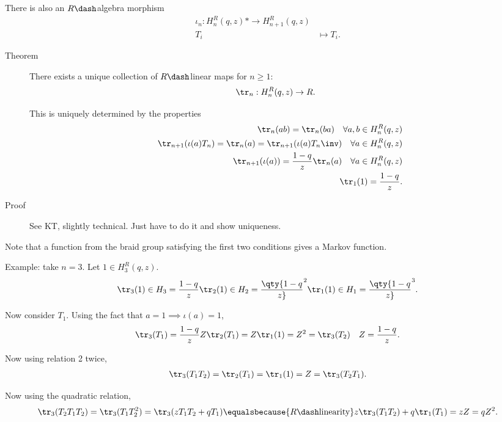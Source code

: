 There is also an \(R\dash\)algebra morphism \begin{align*}
\iota_n: H_n^R(q, z) *\to H_{n+1}^R(q, z) \\
T_i &\mapsto T_i
.\end{align*}

\begin{description}
\item[Theorem]
There exists a unique collection of \(R\dash\)linear maps for
\(n\geq 1\): \begin{align*}
\tr_n: H_n^R(q, z) &\to R
.\end{align*}

This is uniquely determined by the properties \begin{align*}
\tr_n(ab) = \tr_n(ba) \quad \forall a,b\in H_n^R(q ,z) \\
\tr_{n+1}(\iota(a) T_n) = \tr_n(a) = \tr_{n+1} (\iota(a) T_n\inv) \quad \forall a\in H_n^R(q, z) \\
\tr_{n+1}(\iota(a)) = {1 - q \over z} \tr_n(a) \quad \forall a \in H_n^R(q, z) \\
\tr_1(1) = {1 -q \over z}
.\end{align*}
\item[Proof]
See KT, slightly technical. Just have to do it and show uniqueness.
\end{description}

Note that a function from the braid group satisfying the first two
conditions gives a Markov function.

Example: take \(n=3\). Let \(1\in H_3^R(q, z)\). \begin{align*}
\tr_3(1) \in H_3 = {1 -q \over z} \tr_2(1) \in H_2 = \qty{1 - q \over z}^2 \tr_1(1) \in H_1 = \qty{1-q \over z}^3
.\end{align*}

Now consider \(T_1\). Using the fact that \(a=1 \implies \iota(a) = 1\),
\begin{align*}
\tr_3(T_1) = {1-q \over z} Z \tr_2(T_1) = Z \tr_1(1) = Z^2 = \tr_3(T_2) \quad Z = {1-q \over z}
.\end{align*}

Now using relation 2 twice, \begin{align*}
\tr_3(T_1 T_2) = \tr_2(T_1) = \tr_1(1) = Z = \tr_3(T_2 T_1)
.\end{align*}

Now using the quadratic relation, \begin{align*}
\tr_3(T_2 T_1 T_2) = \tr_3(T_1 T_2^2) = \tr_3(zT_1 T_2 + qT_1) \equalsbecause{R\dash\text{linearity}} z\tr_3(T_1 T_2) + q\tr_1(T_1) = zZ = qZ^2
.\end{align*}

